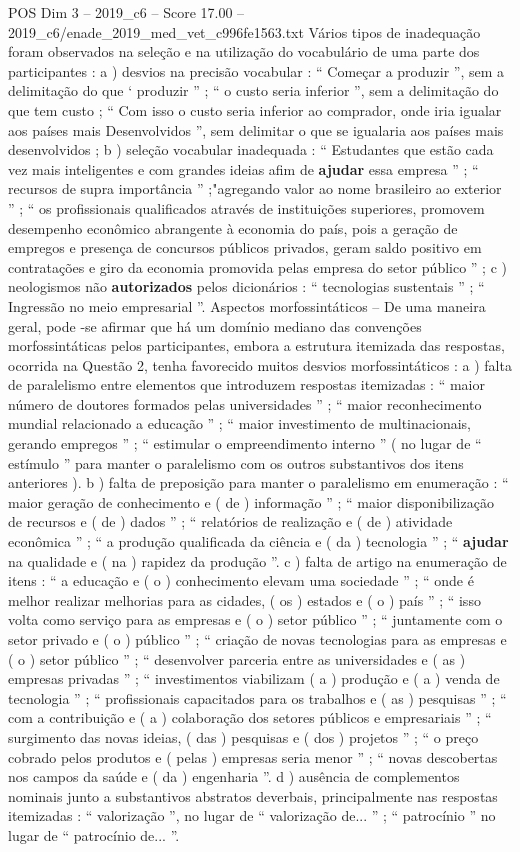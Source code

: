 \begin{textsample}{POS Dim 3 – 2019\_c6 – Score 17.00 – 2019\_c6/enade\_2019\_med\_vet\_c996fe1563.txt}
Vários tipos de inadequação foram observados na seleção e na utilização do vocabulário de uma parte dos participantes : a ) desvios na precisão vocabular : “ Começar a produzir ”, sem a delimitação do que ‘ produzir ” ; “ o custo seria inferior ”, sem a delimitação do que tem custo ; “ Com isso o custo seria inferior ao comprador, onde iria igualar aos países mais Desenvolvidos ”, sem delimitar o que se igualaria aos países mais desenvolvidos ; b ) seleção vocabular inadequada : “ Estudantes que estão cada vez mais inteligentes e com grandes ideias afim de \textbf{ajudar} essa empresa ” ; “ recursos de supra importância ” ;"agregando valor ao nome brasileiro ao exterior ” ; “ os profissionais qualificados através de instituições superiores, promovem desempenho econômico abrangente à economia do país, pois a geração de empregos e presença de concursos públicos privados, geram saldo positivo em contratações e giro da economia promovida pelas empresa do setor público ” ; c ) neologismos não \textbf{autorizados} pelos dicionários : “ tecnologias sustentais ” ; “ Ingressão no meio empresarial ”.
Aspectos morfossintáticos – De uma maneira geral, pode -se afirmar que há um domínio mediano das convenções morfossintáticas pelos participantes, embora a estrutura itemizada das respostas, ocorrida na Questão 2, tenha favorecido muitos desvios morfossintáticos : a ) falta de paralelismo entre elementos que introduzem respostas itemizadas : “ maior número de doutores formados pelas universidades ” ; “ maior reconhecimento mundial relacionado a educação ” ; “ maior investimento de multinacionais, gerando empregos ” ; “ estimular o empreendimento interno ” ( no lugar de “ estímulo ” para manter o paralelismo com os outros substantivos dos itens anteriores ). b ) falta de preposição para manter o paralelismo em enumeração : “ maior geração de conhecimento e ( de ) informação ” ; “ maior disponibilização de recursos e ( de ) dados ” ; “ relatórios de realização e ( de ) atividade econômica ” ; “ a produção qualificada da ciência e ( da ) tecnologia ” ; “ \textbf{ajudar} na qualidade e ( na ) rapidez da produção ”. c ) falta de artigo na enumeração de itens : “ a educação e ( o ) conhecimento elevam uma sociedade ” ; “ onde é melhor realizar melhorias para as cidades, ( os ) estados e ( o ) país ” ; “ isso volta como serviço para as empresas e ( o ) setor público ” ; “ juntamente com o setor privado e ( o ) público ” ; “ criação de novas tecnologias para as empresas e ( o ) setor público ” ; “ desenvolver parceria entre as universidades e ( as ) empresas privadas ” ; “ investimentos viabilizam ( a ) produção e ( a ) venda de tecnologia ” ; “ profissionais capacitados para os trabalhos e ( as ) pesquisas ” ; “ com a contribuição e ( a ) colaboração dos setores públicos e empresariais ” ; “ surgimento das novas ideias, ( das ) pesquisas e ( dos ) projetos ” ; “ o preço cobrado pelos produtos e ( pelas ) empresas seria menor ” ; “ novas descobertas nos campos da saúde e ( da ) engenharia ”. d ) ausência de complementos nominais junto a substantivos abstratos deverbais, principalmente nas respostas itemizadas : “ valorização ”, no lugar de “ valorização de... ” ; “ patrocínio ” no lugar de “ patrocínio de... ”.

\end{textsample}
